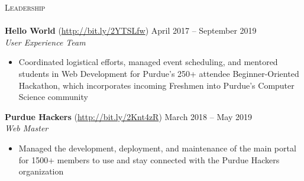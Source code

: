 \documentclass[letterpaper, 10pt]{article}
\newcommand{\lineunder} {
    \vspace*{-8pt} \\
    \hspace*{-18pt} \hrulefill \\
}
\newcommand{\header} [1] {
    {
        \hspace*{-18pt}\vspace*{6pt}
        {\large\textsc{#1}}
    }
    \vspace*{-6pt} \lineunder
}
\begin{document}
\header{Leadership}

{\textbf{Hello World}} (\href{http://bit.ly/2YTSLfw}{http://bit.ly/2YTSLfw}) \hfill April 2017 -- September 2019\\
\textit{User Experience Team}\\
\vspace{-1mm}
\begin{itemize} \itemsep 1pt
    \item Coordinated logistical efforts, managed event scheduling, and mentored students in Web Development for Purdue’s 250+ attendee Beginner-Oriented Hackathon, which incorporates incoming Freshmen into Purdue’s Computer Science community
\end{itemize}

\textbf{Purdue Hackers} (\href{http://bit.ly/2Knt4zR}{http://bit.ly/2Knt4zR})
\hfill March 2018 -- May 2019\\
\textit{Web Master}\\
\vspace{-1mm}
\begin{itemize} \itemsep 1pt
    \item Managed the development, deployment, and maintenance of the main portal for 1500+ members to use and stay connected with the Purdue Hackers organization
\end{itemize}

\vspace*{2mm}

\
\end{document}
